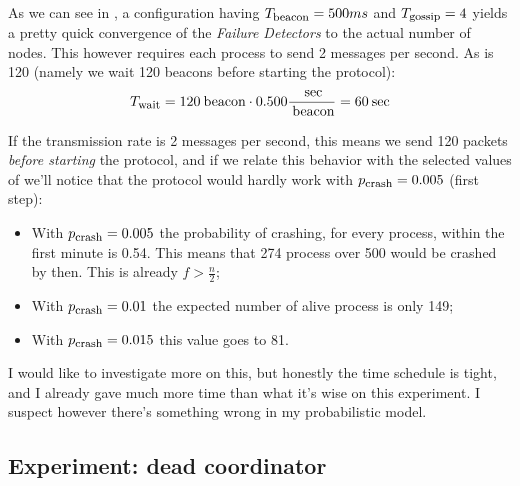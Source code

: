 As we can see in , a configuration having
${T}_{\mbox{\footnotesize{beacon}}} = 500 ms$ and ${T}_{\mbox{\footnotesize{gossip}}} = 4$ yields a
pretty quick convergence of the \emph{Failure Detectors} to the actual
number of nodes. This however requires each process to send 2 messages per
second. As  is 120 (namely we wait 120 beacons
before starting the protocol):
\[
    {T}_{\mbox{\footnotesize{wait}}}
        = 120 \:\mbox{beacon} \cdot 0.500 \frac{\:\mbox{sec}}{\:\mbox{beacon}} = 60 \:\mbox{sec}
\]

If the transmission rate is 2 messages per second, this means we send 120
packets \emph{before starting} the protocol, and if we relate this
behavior with the selected values of \PCrash we'll notice that the
protocol would hardly work with ${p}_{\mbox{\footnotesize{crash}}} = 0.005$ (first step):

\begin{itemize}

\item   With ${p}_{\mbox{\footnotesize{crash}}} = 0.005$ the probability of crashing, for every
        process, within the first minute is 0.54. This means that 274
        process over 500 would be crashed by then. This is already $f >
        \frac{n}{2}$;

\item   With ${p}_{\mbox{\footnotesize{crash}}} = 0.01$ the expected number of alive process is only
        149;

\item   With ${p}_{\mbox{\footnotesize{crash}}} = 0.015$ this value goes to 81.

\end{itemize}

I would like to investigate more on this, but honestly the time schedule
is tight, and I already gave much more time than what it's wise on this
experiment. I suspect however there's something wrong in my probabilistic
model.


\subsection{Experiment: dead coordinator}


